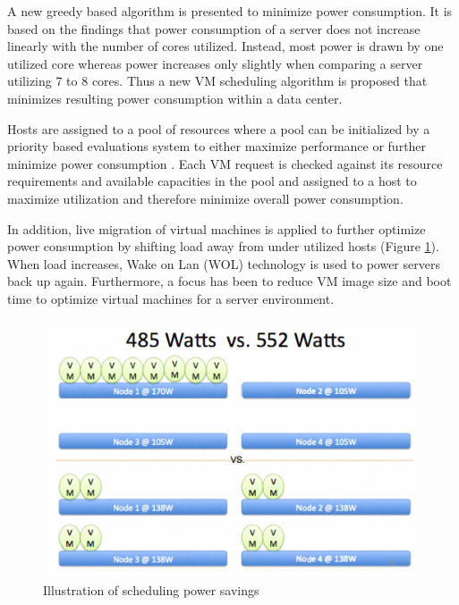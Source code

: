 A new greedy based algorithm is presented to minimize power consumption. It is based on the findings that power consumption of a server does not increase linearly with the number of cores utilized. Instead, most power is drawn by one utilized core whereas power increases only slightly when comparing a server utilizing 7 to 8 cores. Thus a new VM scheduling algorithm is proposed that minimizes resulting power consumption within a data center. 

Hosts are assigned to a pool of resources where a pool can be initialized by a priority based evaluations system to either maximize performance or further minimize power consumption \cite{younge2010efficient}. Each VM request is checked against its resource requirements and available capacities in the pool and assigned to a host to maximize utilization and therefore minimize overall power consumption. 

In addition, live migration of virtual machines is applied to further optimize power consumption by shifting load away from under utilized hosts (Figure \ref{fig:server_power_consumption}). When load increases, Wake on Lan (WOL) technology is used to power servers back up again. Furthermore, a focus has been to reduce VM image size and boot time to optimize virtual machines for a server environment. 


\begin{figure}[htbp]
	\centering
		\includegraphics{figures/state_of_the_art/server_power_consumption.PNG}
	\caption{Illustration of scheduling power savings \cite{younge2010efficient}}
	\label{fig:server_power_consumption}
\end{figure}

